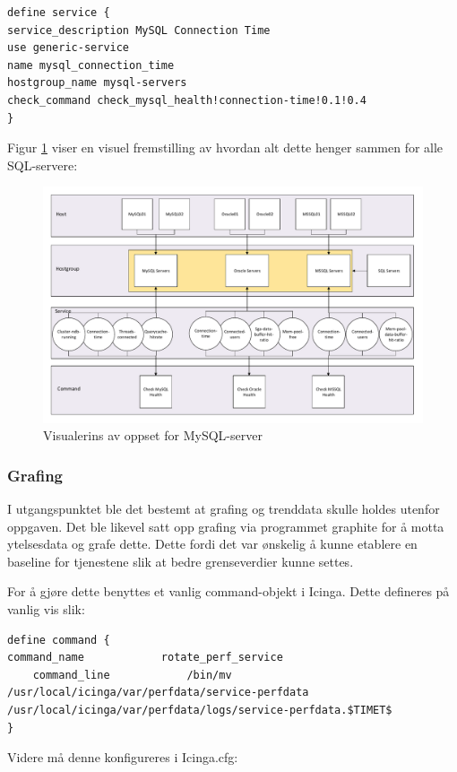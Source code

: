 \begin{lstlisting}
define service {
service_description MySQL Connection Time
use generic-service
name mysql_connection_time
hostgroup_name mysql-servers
check_command check_mysql_health!connection-time!0.1!0.4
}
\end{lstlisting}

Figur \ref{sql} viser en visuel fremstilling av hvordan alt dette henger sammen for alle SQL-servere:

\begin{figure}
    \centering
    \includegraphics[scale=0.6]{img/sql}
    \caption{Visualerins av oppset for MySQL-server}
    \label{sql}
\end{figure}



\subsubsection{Grafing}
I utgangspunktet ble det bestemt at grafing og trenddata skulle holdes utenfor oppgaven. Det ble likevel satt opp grafing via programmet graphite for å motta ytelsesdata og grafe dette. Dette fordi det var ønskelig å kunne etablere en baseline for tjenestene slik at bedre grenseverdier kunne settes.

For å gjøre dette benyttes et vanlig command-objekt i Icinga. Dette defineres på vanlig vis slik:

\begin{lstlisting}
define command {
command_name            rotate_perf_service
    command_line            /bin/mv /usr/local/icinga/var/perfdata/service-perfdata /usr/local/icinga/var/perfdata/logs/service-perfdata.$TIMET$
}
\end{lstlisting}
Videre må denne konfigureres i Icinga.cfg:

